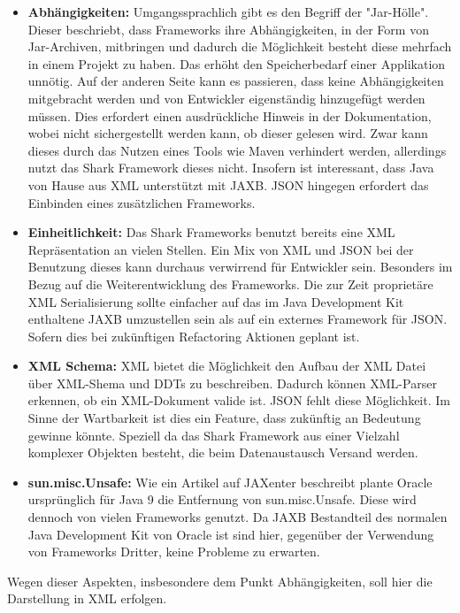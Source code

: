 \documentclass[a4paper]{article}
\begin{document}
	\begin{itemize}
		\item \textbf{Abhängigkeiten:} Umgangssprachlich gibt es den Begriff der
		"Jar-Hölle". Dieser beschriebt, dass Frameworks ihre Abhängigkeiten, in der
		Form von Jar-Archiven, mitbringen und dadurch die Möglichkeit besteht diese
		mehrfach in einem Projekt zu haben. Das erhöht den Speicherbedarf einer
		Applikation unnötig. Auf der anderen Seite kann es passieren, dass keine
		Abhängigkeiten mitgebracht werden und  von Entwickler eigenständig
		hinzugefügt werden müssen. Dies erfordert einen ausdrückliche Hinweis in
		der Dokumentation, wobei nicht sichergestellt werden kann, ob dieser
		gelesen	wird. Zwar kann dieses durch das Nutzen eines Tools wie Maven
		verhindert werden, allerdings nutzt das Shark Framework dieses nicht.
		Insofern ist interessant, dass Java von Hause aus XML unterstützt mit JAXB.
		JSON hingegen erfordert das Einbinden eines zusätzlichen Frameworks.
		\item \textbf{Einheitlichkeit:} Das Shark Frameworks benutzt bereits eine
		XML Repräsentation an vielen Stellen. Ein Mix von XML und JSON bei der
		Benutzung dieses kann durchaus verwirrend für Entwickler sein. Besonders
		im Bezug auf die Weiterentwicklung des Frameworks. Die zur Zeit proprietäre
		XML Serialisierung sollte einfacher auf das im Java Development Kit
		enthaltene JAXB umzustellen sein als auf ein externes Framework für JSON.
		Sofern dies bei zukünftigen Refactoring Aktionen geplant ist.
		\item \textbf{XML Schema:} XML bietet die Möglichkeit den
		Aufbau der XML Datei über XML-Shema und DDTs zu beschreiben. Dadurch
		können XML-Parser erkennen, ob ein XML-Dokument valide ist. JSON fehlt
		diese Möglichkeit. Im Sinne der Wartbarkeit ist dies ein Feature, dass
		zukünftig an Bedeutung gewinne könnte. Speziell da das Shark Framework
		aus einer Vielzahl komplexer Objekten besteht, die beim Datenaustausch
		Versand werden.
		\item \textbf{sun.misc.Unsafe:} Wie ein Artikel auf JAXenter \cite{unsafe}
		beschreibt plante Oracle ursprünglich für Java 9 die Entfernung von
		sun.misc.Unsafe. Diese wird dennoch von vielen Frameworks genutzt. Da
		JAXB Bestandteil des normalen Java Development Kit von Oracle ist sind
		hier, gegenüber der Verwendung von Frameworks Dritter, keine Probleme zu
		erwarten.
		
	\end{itemize} 	
	
	Wegen dieser Aspekten, insbesondere dem Punkt Abhängigkeiten, soll hier die
	Darstellung in XML erfolgen.
	
\end{document}
